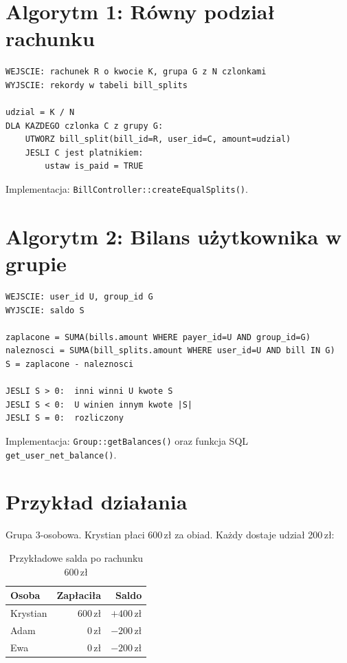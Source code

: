 \documentclass[12pt,a4paper]{report}
\begin{document}
\section{Algorytm 1: R\'owny podzia\l{} rachunku}

\begin{lstlisting}[style=pseudostyle, caption={Pseudokod --- tworzenie bill\_splits}]
WEJSCIE: rachunek R o kwocie K, grupa G z N czlonkami
WYJSCIE: rekordy w tabeli bill_splits

udzial = K / N
DLA KAZDEGO czlonka C z grupy G:
    UTWORZ bill_split(bill_id=R, user_id=C, amount=udzial)
    JESLI C jest platnikiem:
        ustaw is_paid = TRUE
\end{lstlisting}

Implementacja: \texttt{BillController::createEqualSplits()}.

\section{Algorytm 2: Bilans u\.zytkownika w grupie}

\begin{lstlisting}[style=pseudostyle, caption={Pseudokod --- obliczanie salda}]
WEJSCIE: user_id U, group_id G
WYJSCIE: saldo S

zaplacone = SUMA(bills.amount WHERE payer_id=U AND group_id=G)
naleznosci = SUMA(bill_splits.amount WHERE user_id=U AND bill IN G)
S = zaplacone - naleznosci

JESLI S > 0:  inni winni U kwote S
JESLI S < 0:  U winien innym kwote |S|
JESLI S = 0:  rozliczony
\end{lstlisting}

Implementacja: \texttt{Group::getBalances()} oraz funkcja SQL \texttt{get\_user\_net\_balance()}.

\section{Przyk\l{}ad dzia\l{}ania}

Grupa 3-osobowa. Krystian p\l{}aci 600\,z\l{} za obiad. Ka\.zdy dostaje udzia\l{} 200\,z\l{}:

\begin{table}[H]
\centering
\begin{tabular}{@{}lrr@{}}
\toprule
\textbf{Osoba} & \textbf{Zap\l{}aci\l{}a} & \textbf{Saldo} \\
\midrule
Krystian & 600\,z\l{} & $+400$\,z\l{} \\
Adam     & 0\,z\l{}   & $-200$\,z\l{} \\
Ewa      & 0\,z\l{}   & $-200$\,z\l{} \\
\bottomrule
\end{tabular}
\caption{Przyk\l{}adowe salda po rachunku 600\,z\l{}}
\end{table}
\end{document}
